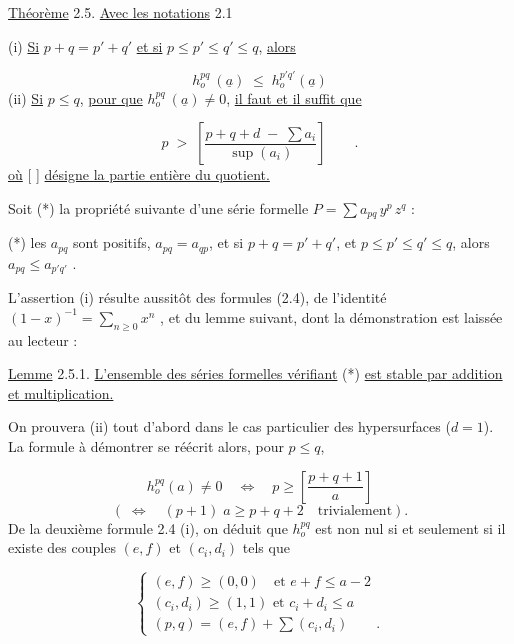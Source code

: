 \underline{Théorème} 2.5. \underline{Avec les notations} 2.1

(i) \quad \underline{Si} $p+q = p'+q'$ \underline{et si} $p \leq p' \leq q' \leq q$, \underline{alors}

\begin{equation*}
h_{o}^{pq}\ (\underline{a}) \;\leq\; h_{o}^{p'q'}(\underline{a})
\end{equation*}
(ii) \quad \underline{Si} $p \leq q$, \underline{pour que} $h_{o}^{pq}\ (\underline{a}) \neq 0$, \underline{il faut et il suffit que} 



\begin{equation*}
 p \;>\; \left[\frac{p+q+d \;-\; \sum a_i}{\sup(a_i)}\right] \qquad .
\end{equation*}
\underline{où} [ ] \underline{désigne la partie entière du quotient.}

Soit (*) la propriété suivante d'une série formelle $P = \sum a_{pq} \, y^p \, z^q$ :

(*)  les $a_{pq}$ sont positifs, $a_{pq} = a_{qp}$, et si $p+q = p'+q'$, et $p \leqslant p' \leqslant q' \leqslant q$, alors $a_{pq} \leqslant a_{p'q'}$ .

L'assertion (i) résulte aussitôt des formules (2.4), de l'identité $(1-x)^{-1} = \sum_{n \geqslant 0} x^n$ , et du lemme suivant, dont la démonstration est laissée au lecteur :

\underline{Lemme} 2.5.1. \underline{L'ensemble des séries formelles vérifiant} (*) \underline{est stable par addition et multiplication.}

On prouvera (ii) tout d'abord dans le cas particulier des hypersurfaces ($d = 1$). La formule à démontrer se réécrit alors, pour $p \leqslant q$,

\begin{equation}\tag{2.5.2}
h_o^{pq}(a) \neq 0 \quad \Longleftrightarrow \quad p \geqslant \left[\frac{p+q+1}{a}\right]
\end{equation}
\begin{equation*}
(\; \Longleftrightarrow \quad (p+1) \; a \geqslant p+q+2 \quad \mbox{trivialement}).
\end{equation*}
De la deuxième formule 2.4 (i), on déduit que $h_o^{pq}$ est non nul si et seulement si il existe des couples $(e,f)$ et $(c_i,d_i)$ tels que

\begin{equation}\tag{2.5.3}
\left\{
\begin{array}{l}
(e,f) \geqslant (0,0) \quad \mbox{et } e+f \leqslant a-2 \\[3mm]
(c_i,d_i) \geqslant (1,1) \mbox{ et } c_i+d_i \leqslant a \\[3mm]
(p,q) = (e,f) + \sum (c_i,d_i) \qquad .
\end{array}
\right.
\end{equation}


